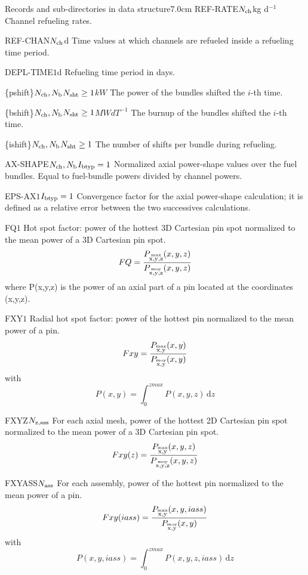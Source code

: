 \begin{DescriptionEnregistrement}{Records and sub-directories
 in  data structure}{7.0cm}
\RealEnr
 {REF-RATE}{$N_{\rm ch}$}{kg d$^{-1}$}
 {Channel refueling rates.}

\OptRealEnr
 {REF-CHAN}{$N_{\rm ch}$}{}{d}
 {Time values at which channels are refueled inside a refueling time 
 period.}

\OptRealEnr
 {DEPL-TIME}{$1$}{}{d}
 {Refueling time period in days.}

\OptRealVar
 {\{pshift\}}{$N_{\rm ch}, N_{\rm b}$}{$N_{\rm sht}\ge 1$}{$kW$}
 {The power of the bundles shifted the $i$-th time.}
            
\OptRealVar
 {\{bshift\}}{$N_{\rm ch}, N_{\rm b}$}{$N_{\rm sht} \ge 1$}{$MW d T^{-1}$}
 {The burnup of the bundles shifted the $i$-th time.}
            
\OptIntVar
 {\{ishift\}}{$N_{\rm ch},N_{\rm b}$}{$N_{\rm sht} \ge 1$}
 {The number of  shifts per bundle during refueling.}

\OptRealEnr
 {AX-SHAPE}{$N_{\rm ch}, N_{\rm b}$}{$I_{\rm btyp}=1$}{}
 {Normalized axial power-shape values over the fuel bundles. Equal to
 fuel-bundle powers divided by channel powers.}

\OptRealEnr
 {EPS-AX}{$1$}{$I_{\rm btyp}=1$}{}
 {Convergence factor for the axial power-shape calculation; it is
  defined as a relative error between the two successives calculations.}

\OptRealEnr
 {FQ}{$1$}{}{}
 {Hot spot factor: power of the hottest 3D Cartesian pin spot 
  normalized to the mean power of a 3D Cartesian pin spot.
  $$
  FQ={P_{\rm \overset{max}{x,y,z}}(x,y,z)\over P_{\rm \overset{moy}{x,y,z}}(x,y,z)}
  $$
  where P(x,y,z) is the power of an axial part of a pin located at the coordinates 
  (x,y,z).
  }

\OptRealEnr
 {FXY}{$1$}{}{}
 {Radial hot spot factor: power of the hottest pin normalized to the mean power of a pin.
  $$
  Fxy={P_{\rm \overset{max}{x,y}}(x,y)\over P_{\rm \overset{moy}{x,y}}(x,y)}
  $$
  with $$P(x,y)=\displaystyle \int_{0}^{zmax} 
  P(x,y,z) \, \mathrm{d}z$$
  }

\OptRealEnr
 {FXYZ}{$N_{\rm z,ass}$}{}{}
 {For each axial mesh, power of the hottest 2D Cartesian pin spot normalized to the mean 
  power of a 3D Cartesian pin spot.
  $$
  Fxy(z)={P_{\rm \overset{max}{x,y}}(x,y,z)\over P_{\rm \overset{moy}{x,y,z}}(x,y,z)}
  $$
  }

\OptRealEnr
 {FXYASS}{$N_{\rm ass}$}{}{}
 {For each assembly, power of the hottest pin normalized to the mean power of a pin.
  $$
  Fxy(iass)={P_{\rm \overset{max}{x,y}}(x,y,iass)\over P_{\rm \overset{moy}{x,y}}(x,y)}
  $$
  with $$P(x,y,iass)=\displaystyle \int_{0}^{zmax} 
  P(x,y,z,iass) \, \mathrm{d}z$$
  }
       

\end{DescriptionEnregistrement}
